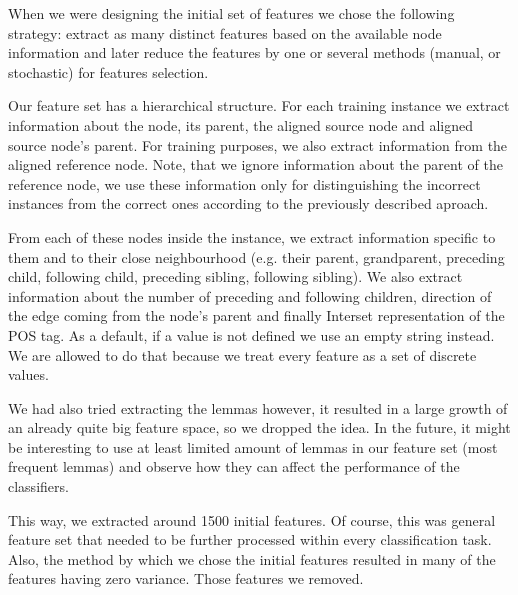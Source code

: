 When we were designing the initial set of features we chose the following
strategy: extract as many distinct features based on the available node information
and later reduce the features by one or several methods (manual, or stochastic)
for features selection.

Our feature set has a hierarchical structure. For each training instance we extract
information about the node, its parent, the aligned source node and aligned source node's
parent. For training purposes, we also extract information from the aligned reference
node. Note, that we ignore information about the parent of the reference node, we
use these information only for distinguishing the incorrect instances from the correct ones
according to the previously described aproach.

From each of these  nodes inside the instance, we extract information
specific to them and to their close neighbourhood (e.g. their parent, grandparent,
preceding child, following child, preceding sibling, following sibling). We
also extract information about the number of preceding and following children,
direction of the edge coming from the node's parent and finally Interset representation
of the POS tag. As a default, if a value is not defined we use an empty string instead.
We are allowed to do that because we treat every feature as a set of discrete values.

We had also tried extracting the lemmas however, it resulted in a
large growth of an already quite big feature space, so we dropped the idea.
In the future, it might be interesting to use at least limited amount of lemmas in our
feature set (most frequent lemmas) and observe how they can affect the performance of the classifiers.

This way, we extracted around 1500 initial features. Of course, this was general feature
set that needed to be further processed within every classification task. Also, the method
by which we chose the initial features resulted in many of the features having zero
variance. Those features we removed.


